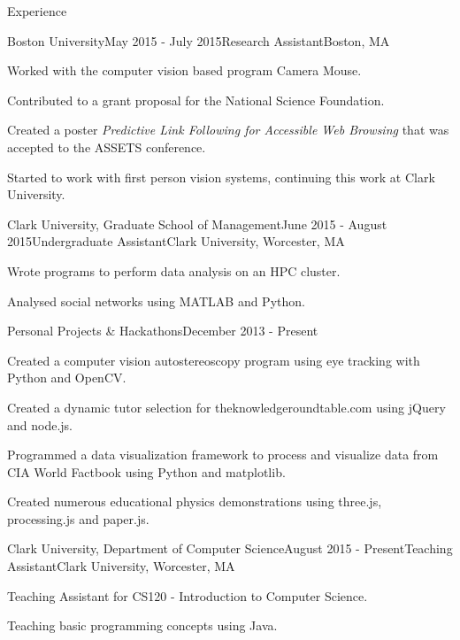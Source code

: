 \documentclass{resume} %
\begin{document}
\begin{rSection}{Experience}

\begin{rSubsection}{Boston University}{May 2015 - July 2015}{Research Assistant}{Boston, MA}
\item Worked with the computer vision based program Camera Mouse.
\item Contributed to a grant proposal for the National Science Foundation.
\item Created a poster \emph{Predictive Link Following for Accessible Web Browsing} that was accepted to the ASSETS conference.
\item Started to work with first person vision systems, continuing this work at Clark University.
\end{rSubsection}


\begin{rSubsection}{Clark University, Graduate School of Management}{June 2015 - August 2015}{Undergraduate Assistant}{Clark University, Worcester, MA}
\item Wrote programs to perform data analysis on an HPC cluster.
\item Analysed social networks using MATLAB and Python.
\end{rSubsection}


\begin{rSubsection}{Personal Projects \& Hackathons}{December 2013 - Present}{}{}
\item Created a computer vision autostereoscopy program using eye tracking with Python and OpenCV.
\item Created a dynamic tutor selection for theknowledgeroundtable.com using jQuery and node.js.
\item Programmed a data visualization framework to process and visualize data from CIA World Factbook using Python and matplotlib.
\item Created numerous educational physics demonstrations using three.js, processing.js and paper.js.
\end{rSubsection}


\begin{rSubsection}{Clark University, Department of Computer Science}{August 2015 - Present}{Teaching Assistant}{Clark University, Worcester, MA}
\item Teaching Assistant for CS120 - Introduction to Computer Science.
\item Teaching basic programming concepts using Java.
\end{rSubsection}

\end{rSection}
\end{document}
